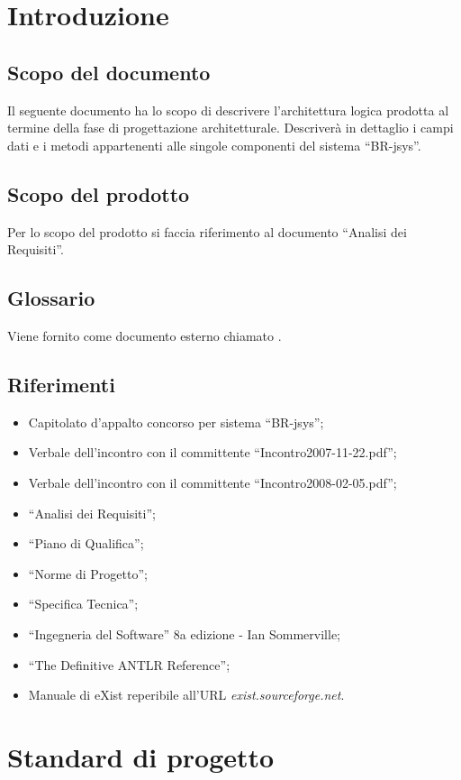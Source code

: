\documentclass[11pt,titlepage,a4paper]{report}
\begin{document}
\tableofcontents 

\chapter{Introduzione}
\section{Scopo del documento}
Il seguente documento ha lo scopo di descrivere l'architettura logica prodotta al termine della fase di progettazione architetturale. Descriver\`a in dettaglio i campi dati e i metodi appartenenti alle singole componenti del sistema ``BR-jsys''.
\section{Scopo del prodotto}
Per lo scopo del prodotto si faccia riferimento al documento ``Analisi dei Requisiti''.

\section{Glossario}
Viene fornito come documento esterno chiamato \Glossario.

\section{Riferimenti}
\begin{itemize}
\item Capitolato d'appalto concorso per sistema ``BR-jsys'';
\item Verbale dell'incontro con il committente ``Incontro2007-11-22.pdf'';
\item Verbale dell'incontro con il committente ``Incontro2008-02-05.pdf'';
\item ``Analisi dei Requisiti'';
\item ``Piano di Qualifica'';
\item ``Norme di Progetto'';
\item ``Specifica Tecnica'';
\item ``Ingegneria del Software'' 8a edizione - Ian Sommerville;
\item ``The Definitive ANTLR Reference'';
\item Manuale di eXist reperibile all'URL \textit{exist.sourceforge.net}.
\end{itemize}
\chapter{Standard di progetto}
\end{document}
